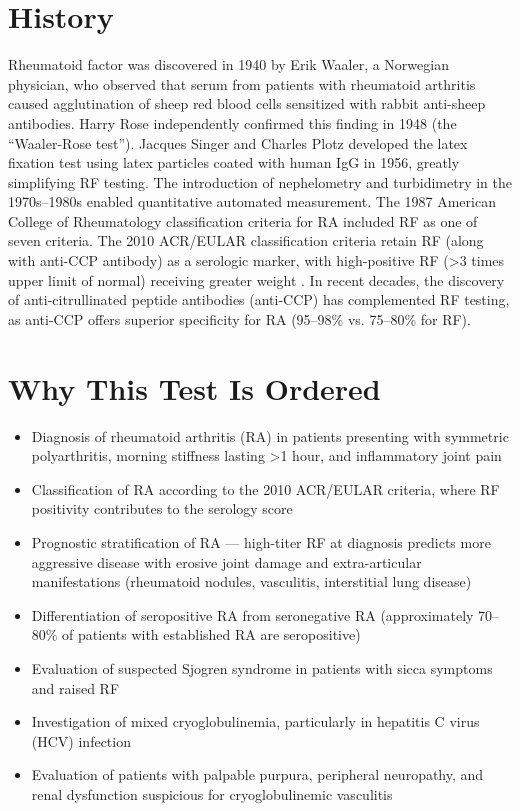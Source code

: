 \section*{History}
Rheumatoid factor was discovered in 1940 by Erik Waaler, a Norwegian physician, who observed that serum from patients with rheumatoid arthritis caused agglutination of sheep red blood cells sensitized with rabbit anti-sheep antibodies. Harry Rose independently confirmed this finding in 1948 (the ``Waaler-Rose test''). Jacques Singer and Charles Plotz developed the latex fixation test using latex particles coated with human IgG in 1956, greatly simplifying RF testing. The introduction of nephelometry and turbidimetry in the 1970s--1980s enabled quantitative automated measurement. The 1987 American College of Rheumatology classification criteria for RA included RF as one of seven criteria. The 2010 ACR/EULAR classification criteria retain RF (along with anti-CCP antibody) as a serologic marker, with high-positive RF (>3 times upper limit of normal) receiving greater weight \cite{aletaha2010}. In recent decades, the discovery of anti-citrullinated peptide antibodies (anti-CCP) has complemented RF testing, as anti-CCP offers superior specificity for RA (95--98\% vs. 75--80\% for RF).

\section*{Why This Test Is Ordered}
\begin{itemize}
  \item Diagnosis of rheumatoid arthritis (RA) in patients presenting with symmetric polyarthritis, morning stiffness lasting >1 hour, and inflammatory joint pain \cite{scott2010rheumatoid}
  \item Classification of RA according to the 2010 ACR/EULAR criteria, where RF positivity contributes to the serology score \cite{aletaha2010}
  \item Prognostic stratification of RA --- high-titer RF at diagnosis predicts more aggressive disease with erosive joint damage and extra-articular manifestations (rheumatoid nodules, vasculitis, interstitial lung disease)
  \item Differentiation of seropositive RA from seronegative RA (approximately 70--80\% of patients with established RA are seropositive)
  \item Evaluation of suspected Sjogren syndrome in patients with sicca symptoms and raised RF
  \item Investigation of mixed cryoglobulinemia, particularly in hepatitis C virus (HCV) infection
  \item Evaluation of patients with palpable purpura, peripheral neuropathy, and renal dysfunction suspicious for cryoglobulinemic vasculitis
\end{itemize}

